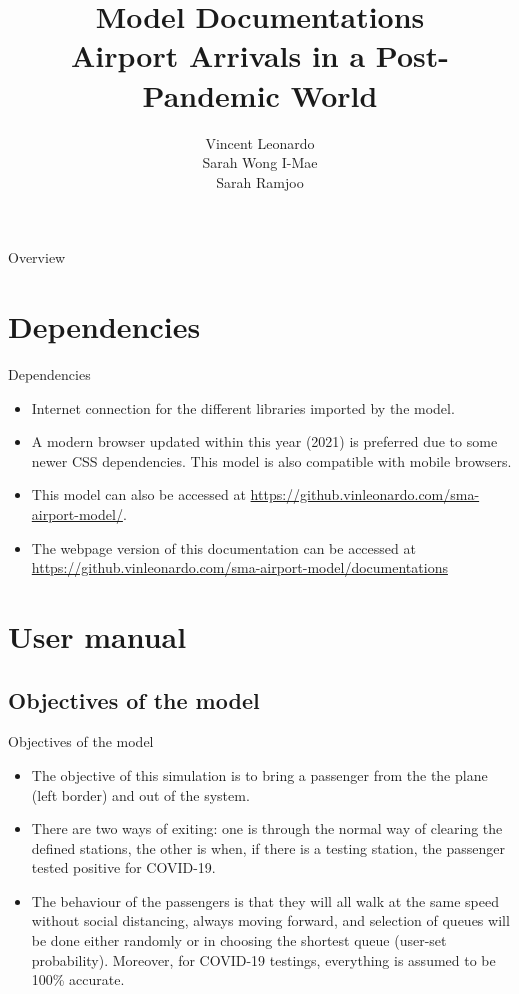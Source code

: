 \documentclass{beamer}
\title{Model Documentations\\Airport Arrivals in a Post-Pandemic World}
\author{Vincent Leonardo\\Sarah Wong I-Mae\\Sarah Ramjoo}
\begin{document}
\begin{frame}[plain]
    \maketitle
\end{frame}
\begin{frame}{Overview}
	\tableofcontents
\end{frame}
\section{Dependencies}
\begin{frame}{Dependencies}
	\begin{itemize}
		\item Internet connection for the different libraries imported by the model.
		\item A modern browser updated within this year (2021) is preferred due to some newer CSS dependencies. This model is also compatible with mobile browsers.
		\item This model can also be accessed at \url{https://github.vinleonardo.com/sma-airport-model/}.
		\item The webpage version of this documentation can be accessed at \url{https://github.vinleonardo.com/sma-airport-model/documentations}
	\end{itemize}
\end{frame}

\section{User manual}
\subsection{Objectives of the model}
\begin{frame}{Objectives of the model}
	\begin{itemize}
		\item The objective of this simulation is to bring a passenger from the the plane (left border) and out of the system.
		\item There are two ways of exiting: one is through the normal way of clearing the defined stations, the other is when, if there is a testing station, the passenger tested positive for COVID-19.
		\item  The behaviour of the passengers is that they will all walk at the same speed without social distancing, always moving forward, and selection of queues will be done either randomly or in choosing the shortest queue (user-set probability). Moreover, for COVID-19 testings, everything is assumed to be 100\% accurate.
	\end{itemize}
\end{frame}
\end{document}
